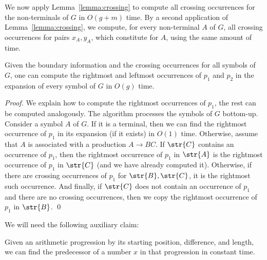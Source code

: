 We now apply Lemma~\ref{lemma:crossing} to compute all crossing occurrences for the non-terminals of $G$ in $O(g+m)$ time. By a second application of Lemma~\ref{lemma:crossing}, we compute, for every non-terminal $A$ of $G$, all crossing occurrences for pairs $x_A,y_A$, which constitute  for $A$, using the same amount of time. 

\begin{proposition}
Given the boundary information and the crossing occurrences for all symbols of $G$, one can compute the rightmost and leftmost occurrences of $p_1$ and $p_2$ in the expansion of every symbol of $G$ in $O(g)$ time. 
\end{proposition}
\begin{proof}
We explain how to compute the rightmost occurrences of $p_1$, the rest can be computed analogously. The algorithm processes the symbols of $G$ bottom-up. Consider a symbol $A$ of $G$. If it is a terminal, then we can find the rightmost occurrence of $p_1$ in its expansion (if it exists) in $O(1)$ time. Otherwise, assume that $A$ is associated with a production $A \rightarrow BC$. If $\str{C}$ contains an occurrence of $p_1$, then the rightmost occurrence of $p_1$ in $\str{A}$ is the rightmost occurrence of $p_1$ in $\str{C}$ (and we have already computed it). Otherwise, if there are crossing occurrences of $p_1$ for $\str{B}, \str{C}$, it is the rightmost such occurrence. And finally, if $\str{C}$ does not contain an occurrence of $p_1$ and there are no crossing occurrences, then we copy the rightmost occurrence of $p_1$ in $\str{B}$. 
\qed
\end{proof} 

We will need the following auxiliary claim:

\begin{observation}\label{obs:arithmetic_predecessor}
Given an arithmetic progression by its starting position, difference, and  length, we can find the predecessor of a number $x$ in that progression in constant time.
\end{observation}
    
